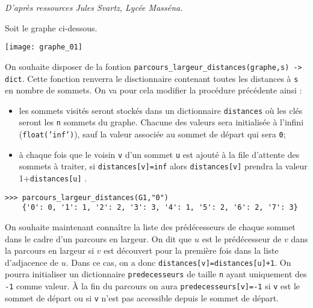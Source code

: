 \begin{flushright}
\textit{D'après ressources Jules Svartz, Lycée Masséna.}
\end{flushright}

Soit le graphe ci-dessous. 

\begin{center}
\texttt{[image: graphe\_01]}
\end{center}



%

On souhaite disposer de la fontion  \texttt{parcours\_largeur\_distances(graphe,s) -> dict}. Cette fonction renverra le disctionnaire contenant toutes les distances à \texttt{s} en nombre de sommets. On va pour cela modifier la procédure précédente ainsi :
\begin{itemize}
\item  les sommets visités seront stockés dans un dictionnaire \texttt{distances} où les clés seront les \texttt{n} sommets du graphe. Chacune des valeurs sera initialisée à l'infini (\texttt{float('inf')}), sauf la valeur associée au sommet de départ qui sera \texttt{0};
\item à chaque fois que le voisin \texttt{v} d'un sommet \texttt{u} est ajouté à la file d'attente des sommets à traiter, 
si \texttt{distances[v]=inf} alors \texttt{distances[v]} prendra la valeur 1+\texttt{distances[u]} .
\end{itemize}

\begin{lstlisting}
>>> parcours_largeur_distances(G1,"0")
	{'0': 0, '1': 1, '2': 2, '3': 3, '4': 1, '5': 2, '6': 2, '7': 3}
\end{lstlisting}
On souhaite maintenant connaître la liste des prédécesseurs de chaque sommet dans le cadre d'un parcours en largeur. On dit que $u$ est le prédécesseur de $v$ dans la parcours en largeur si $v$ est découvert pour la première fois dans la liste d'adjacence de $u$. Dans ce cas, on a donc \texttt{distances[v]=distances[u]+1}.  On pourra initialiser un dictionnaire  \texttt{predecesseurs} de taille \texttt{n} ayant uniquement des \texttt{-1} comme valeur. À la fin du parcours on aura \texttt{predecesseurs[v]=-1} si \texttt{v} est le sommet de départ ou si \texttt{v} n'est pas accessible depuis le sommet de départ. 

